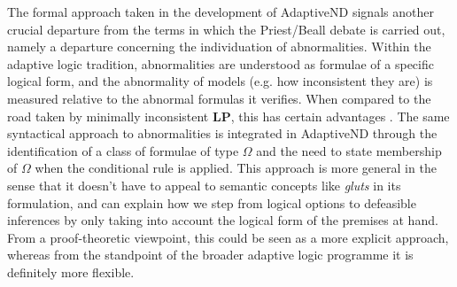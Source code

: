 \documentclass[]{article}
\newtheorem{definition}{Definition}
\newcommand{\TurnADND}[2]
    { {#1}\vdash_{\textbf{\sf AdaptiveND}}  {#2}}
\newcommand{\TurnChecked}[2]
    { {#1}\vdash_{\textbf{\sf \checked}}  {#2}}
\begin{document}
The formal approach taken in the development of \textsf{AdaptiveND} signals another crucial departure from the terms in which the Priest/Beall debate is carried out, namely a departure concerning the individuation of abnormalities. Within the adaptive logic tradition, abnormalities are understood as formulae of a specific logical form, and the abnormality of models (e.g. how inconsistent they are) is measured relative to the abnormal formulas it verifies. When compared to the road taken by minimally inconsistent \textbf{LP}, this has certain advantages \cite{Batens:Synthese:2000}. The same syntactical approach to abnormalities is integrated in \textsf{AdaptiveND} through the identification of a class of formulae of type $\Omega$ and the need to state membership of $\Omega$ when the conditional rule is applied. This approach is more general in the sense that it doesn't have to appeal to semantic concepts like \emph{gluts} in its formulation, and can explain how we step from logical options to defeasible inferences by only taking into account the logical form of the premises at hand. From a proof-theoretic viewpoint, this could be seen as a more explicit approach, whereas from the standpoint of the broader adaptive logic programme it is definitely more flexible.

%
\end{document}
